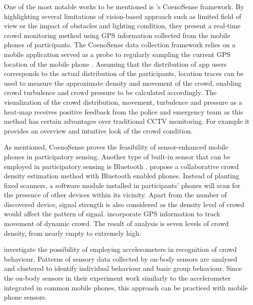 One of the most notable works to be mentioned is \citet{Wirz2012}’s CoenoSense framework. By highlighting several limitations of vision-based approach such as limited field of view or the impact of obstacles and lighting condition, they present a real-time crowd monitoring method using GPS information collected from the mobile phones of participants. The CoenoSense data collection framework relies on a mobile application served as a probe to regularly sampling the current GPS location of the mobile phone \citep{Wirz2013}. Assuming that the distribution of app users corresponds to the actual distribution of the participants, location traces can be used to measure the approximate density and movement of the crowd, enabling crowd turbulence and crowd pressure to be calculated accordingly. The visualization of the crowd distribution, movement, turbulence and pressure as a heat-map receives positive feedback from the police and emergency team as this method has certain advantages over traditional CCTV monitoring. For example it provides an overview and intuitive look of the crowd condition. 

As mentioned, CoenoSense proves the feasibility of sensor-enhanced mobile phones in participatory sensing. Another type of built-in sensor that can be employed in participatory sensing is Bluetooth \citep{Stopczynski2013,Weppner2011,Weppner2013}. \citet{Weppner2011} propose a collaborative crowd density estimation method with Bluetooth enabled phones. Instead of planting fixed scanners, a software module installed in participants’ phones will scan for the presence of other devices within its vicinity. Apart from the number of discovered device, signal strength is also considered as the density level of crowd would affect the pattern of signal. \citet{Weppner2013} incorporate GPS information to track movement of dynamic crowd. The result of analysis is seven levels of crowd density, from nearly empty to extremely high.

\citet{Roggen2011} investigate the possibility of employing accelerometers in recognition of crowd behaviour. Patterns of sensory data collected by on-body sensors are analysed and clustered to identify individual behaviour and basic group behaviour. Since the on-body sensors in their experiment work similarly to the accelerometer integrated in common mobile phones, this approach can be practiced with mobile phone sensors.

